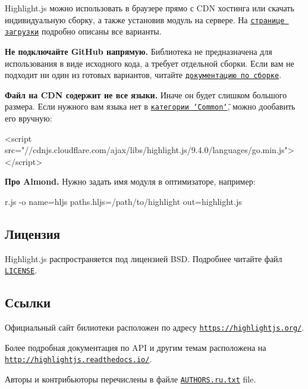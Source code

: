 Highlight.\+js можно использовать в браузере прямо с C\+DN хостинга или скачать индивидуальную сборку, а также установив модуль на сервере. На \href{https://highlightjs.org/download/}{\tt странице загрузки} подробно описаны все варианты.

{\bfseries Не подключайте Git\+Hub напрямую.} Библиотека не предназначена для использования в виде исходного кода, а требует отдельной сборки. Если вам не подходит ни один из готовых вариантов, читайте \href{http://highlightjs.readthedocs.io/en/latest/building-testing.html}{\tt документацию по сборке}.

{\bfseries Файл на C\+DN содержит не все языки.} Иначе он будет слишком большого размера. Если нужного вам языка нет в \href{https://highlightjs.org/download/}{\tt категории \char`\"{}\+Common\char`\"{}}, можно дообавить его вручную\+:


\begin{DoxyCode}
<script src="//cdnjs.cloudflare.com/ajax/libs/highlight.js/9.4.0/languages/go.min.js"></script>
\end{DoxyCode}


{\bfseries Про Almond.} Нужно задать имя модуля в оптимизаторе, например\+:


\begin{DoxyCode}
r.js -o name=hljs paths.hljs=/path/to/highlight out=highlight.js
\end{DoxyCode}


\subsection*{Лицензия}

Highlight.\+js распространяется под лицензией B\+SD. Подробнее читайте файл \href{https://github.com/isagalaev/highlight.js/blob/master/LICENSE}{\tt L\+I\+C\+E\+N\+SE}.

\subsection*{Ссылки}

Официальный сайт билиотеки расположен по адресу \href{https://highlightjs.org/}{\tt https\+://highlightjs.\+org/}.

Более подробная документация по A\+PI и другим темам расположена на \href{http://highlightjs.readthedocs.io/}{\tt http\+://highlightjs.\+readthedocs.\+io/}.

Авторы и контрибьюторы перечислены в файле \href{https://github.com/isagalaev/highlight.js/blob/master/AUTHORS.ru.txt}{\tt A\+U\+T\+H\+O\+R\+S.\+ru.\+txt} file. 